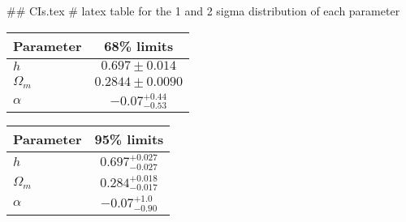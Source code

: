 ## CIs.tex
# latex table for the 1 and 2 sigma distribution of each parameter

\begin{tabular} { l  c}
 Parameter &  68\% limits\\
\hline
{\boldmath$h              $} & $0.697\pm 0.014            $\\
{\boldmath$\Omega_m       $} & $0.2844\pm 0.0090          $\\
{\boldmath$\alpha         $} & $-0.07^{+0.44}_{-0.53}     $\\
\hline
\end{tabular}

\begin{tabular} { l  c}
 Parameter &  95\% limits\\
\hline
{\boldmath$h              $} & $0.697^{+0.027}_{-0.027}   $\\
{\boldmath$\Omega_m       $} & $0.284^{+0.018}_{-0.017}   $\\
{\boldmath$\alpha         $} & $-0.07^{+1.0}_{-0.90}      $\\
\hline
\end{tabular}
